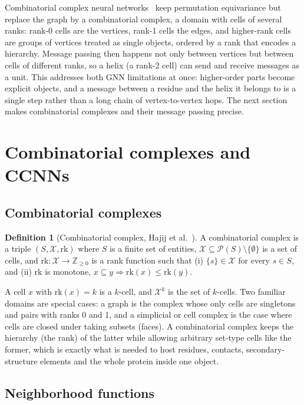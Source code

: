 \documentclass[11pt,a4paper]{article}
\theoremstyle{definition}
\newtheorem{definition}{Definition}
\begin{document}
Combinatorial complex neural networks~\cite{hoan} keep permutation equivariance
but replace the graph by a combinatorial complex, a domain with cells of several
ranks: rank-0 cells are the vertices, rank-1 cells the edges, and higher-rank
cells are groups of vertices treated as single objects, ordered by a rank that
encodes a hierarchy. Message passing then happens not only between vertices but
between cells of different ranks, so a helix (a rank-2 cell) can send and receive
messages as a unit. This addresses both GNN limitations at once: higher-order
parts become explicit objects, and a message between a residue and the helix it
belongs to is a single step rather than a long chain of vertex-to-vertex hops.
The next section makes combinatorial complexes and their message passing precise.

\section{Combinatorial complexes and CCNNs}
\label{sec:ccnn}

\subsection{Combinatorial complexes}

\begin{definition}[Combinatorial complex, Hajij et al.~\cite{hoan}]
A combinatorial complex is a triple $(S,\mathcal{X},\mathrm{rk})$ where $S$ is a
finite set of entities, $\mathcal{X}\subseteq\mathcal{P}(S)\setminus\{\emptyset\}$
is a set of cells, and $\mathrm{rk}:\mathcal{X}\to\mathbb{Z}_{\ge 0}$ is a rank
function such that (i) $\{s\}\in\mathcal{X}$ for every $s\in S$, and (ii)
$\mathrm{rk}$ is monotone, $x\subseteq y\Rightarrow\mathrm{rk}(x)\le\mathrm{rk}(y)$.
\end{definition}

A cell $x$ with $\mathrm{rk}(x)=k$ is a $k$-cell, and $\mathcal{X}^k$ is the set of
$k$-cells. Two familiar domains are special cases: a graph is the complex whose
only cells are singletons and pairs with ranks 0 and 1, and a simplicial or cell
complex is the case where cells are closed under taking subsets (faces). A
combinatorial complex keeps the hierarchy (the rank) of the latter while allowing
arbitrary set-type cells like the former, which is exactly what is needed to host
residues, contacts, secondary-structure elements and the whole protein inside one
object.

\subsection{Neighborhood functions}
\end{document}
